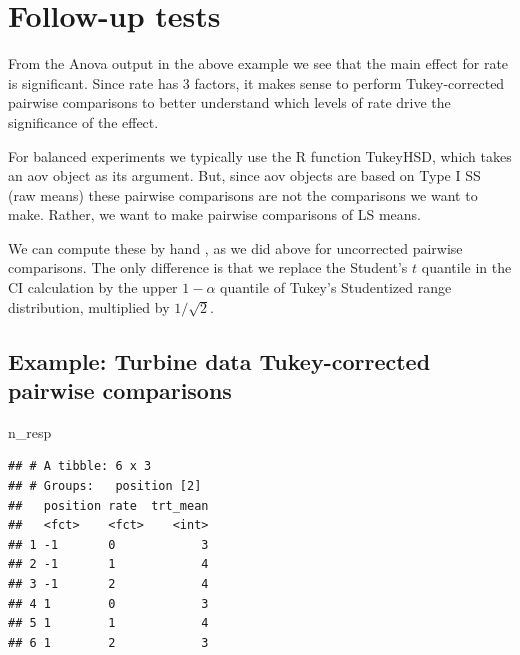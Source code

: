 \documentclass[
]{book}
\newenvironment{Shaded}{\begin{snugshade}}{\end{snugshade}}
\newcommand{\NormalTok}[1]{#1}
\begin{document}
\hypertarget{follow-up-tests}{%
\section{Follow-up tests}\label{follow-up-tests}}

From the Anova output in the above example we see that the main effect for rate is significant. Since rate has 3 factors, it makes sense to perform Tukey-corrected pairwise comparisons to better understand which levels of rate drive the significance of the effect.

For balanced experiments we typically use the R function TukeyHSD, which takes an aov object as its argument. But, since aov objects are based on Type I SS (raw means) these pairwise comparisons are not the comparisons we want to make. Rather, we want to make pairwise comparisons of LS means.

We can compute these by hand , as we did above for uncorrected pairwise comparisons. The only difference is that we replace the Student's \(t\) quantile in the CI calculation by the upper \(1-\alpha\) quantile of Tukey's Studentized range distribution, multiplied by \(1/\sqrt{2}\).

\hypertarget{example-turbine-data-tukey-corrected-pairwise-comparisons}{%
\subsection{Example: Turbine data Tukey-corrected pairwise comparisons}\label{example-turbine-data-tukey-corrected-pairwise-comparisons}}

\begin{Shaded}
\begin{Highlighting}[]
\NormalTok{n\_resp}
\end{Highlighting}
\end{Shaded}

\begin{verbatim}
## # A tibble: 6 x 3
## # Groups:   position [2]
##   position rate  trt_mean
##   <fct>    <fct>    <int>
## 1 -1       0            3
## 2 -1       1            4
## 3 -1       2            4
## 4 1        0            3
## 5 1        1            4
## 6 1        2            3
\end{verbatim}
\end{document}
